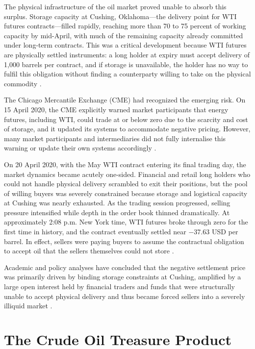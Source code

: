 \documentclass[a4paper,11pt]{article}
\begin{document}
The physical infrastructure of the oil market proved unable to absorb
this surplus. Storage capacity at Cushing, Oklahoma---the delivery
point for WTI futures contracts---filled rapidly, reaching more than
70 to 75 percent of working capacity by mid-April, with much of the
remaining capacity already committed under long-term contracts. This
was a critical development because WTI futures are physically settled
instruments: a long holder at expiry must accept delivery of 1,000
barrels per contract, and if storage is unavailable, the holder has
no way to fulfil this obligation without finding a counterparty
willing to take on the physical commodity \cite{wharton2024benchmarks}.

The Chicago Mercantile Exchange (CME) had recognized the emerging
risk. On 15 April 2020, the CME explicitly warned market participants
that energy futures, including WTI, could trade at or below zero due
to the scarcity and cost of storage, and it updated its systems to
accommodate negative pricing. However, many market participants and
intermediaries did not fully internalise this warning or update their
own systems accordingly \cite{cgtn2020fined}.

On 20 April 2020, with the May WTI contract entering its final
trading day, the market dynamics became acutely one-sided. Financial
and retail long holders who could not handle physical delivery
scrambled to exit their positions, but the pool of willing buyers was
severely constrained because storage and logistical capacity at
Cushing was nearly exhausted. As the trading session progressed,
selling pressure intensified while depth in the order book thinned
dramatically. At approximately 2:08 p.m. New York time, WTI futures
broke through zero for the first time in history, and the contract
eventually settled near $-$37.63 USD per barrel. In effect, sellers
were paying buyers to assume the contractual obligation to accept oil
that the sellers themselves could not store \cite{atlantis2021fmet}.

Academic and policy analyses have concluded that the negative
settlement price was primarily driven by binding storage constraints
at Cushing, amplified by a large open interest held by financial
traders and funds that were structurally unable to accept physical
delivery and thus became forced sellers into a severely illiquid
market \cite{wharton2024benchmarks}.

\section{The Crude Oil Treasure Product}
\end{document}
